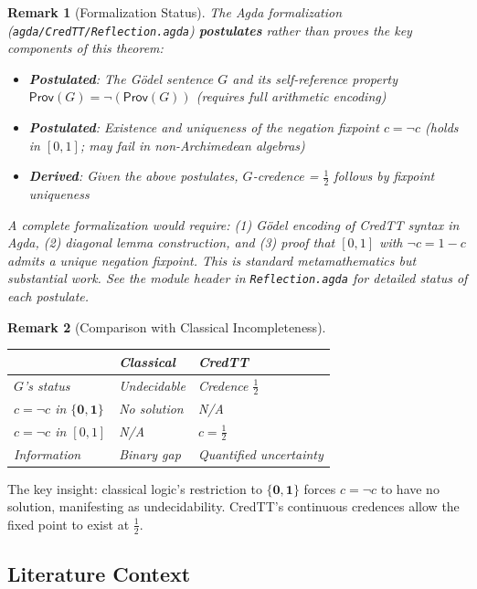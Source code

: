 \documentclass[11pt,a4paper]{article}
\newtheorem{remark}{Remark}[section]
\newcommand{\one}{\mathbf{1}}
\newcommand{\zero}{\mathbf{0}}
\newcommand{\negc}{\neg}
\begin{document}
\begin{remark}[Formalization Status]
The Agda formalization (\texttt{agda/CredTT/Reflection.agda}) \textbf{postulates} rather than proves the key components of this theorem:
\begin{itemize}
    \item \textbf{Postulated}: The G\"odel sentence $G$ and its self-reference property $\mathsf{Prov}(G) = \negc(\mathsf{Prov}(G))$ (requires full arithmetic encoding)
    \item \textbf{Postulated}: Existence and uniqueness of the negation fixpoint $c = \negc c$ (holds in $[0,1]$; may fail in non-Archimedean algebras)
    \item \textbf{Derived}: Given the above postulates, $G$-credence = $\frac{1}{2}$ follows by fixpoint uniqueness
\end{itemize}
A complete formalization would require: (1) G\"odel encoding of CredTT syntax in Agda, (2) diagonal lemma construction, and (3) proof that $[0,1]$ with $\negc c = 1-c$ admits a unique negation fixpoint. This is standard metamathematics but substantial work. See the module header in \texttt{Reflection.agda} for detailed status of each postulate.
\end{remark}

\begin{remark}[Comparison with Classical Incompleteness]
\begin{center}
\begin{tabular}{l|l|l}
& \textbf{Classical} & \textbf{CredTT} \\
\hline
$G$'s status & Undecidable & Credence $\frac{1}{2}$ \\
$c = \negc c$ in $\{\zero, \one\}$ & No solution & N/A \\
$c = \negc c$ in $[0,1]$ & N/A & $c = \frac{1}{2}$ \\
Information & Binary gap & Quantified uncertainty \\
\end{tabular}
\end{center}
\end{remark}

The key insight: classical logic's restriction to $\{\zero, \one\}$ forces $c = \negc c$ to have no solution, manifesting as undecidability. CredTT's continuous credences allow the fixed point to exist at $\frac{1}{2}$.

\subsection{Literature Context}
\end{document}

